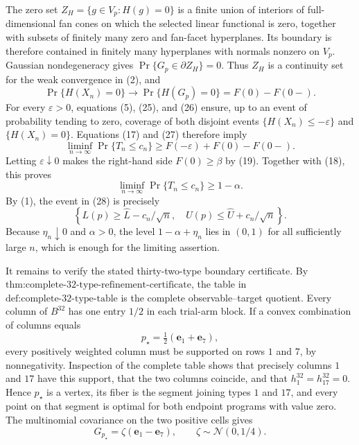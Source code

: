 The zero set \(Z_H=\{g\in V_p:H(g)=0\}\) is a finite union of interiors of full-dimensional fan cones on which the selected linear functional is zero, together with subsets of finitely many zero and fan-facet hyperplanes.  Its boundary is therefore contained in finitely many hyperplanes with normals nonzero on \(V_p\).  Gaussian nondegeneracy gives \(\Pr\{G_p\in\partial Z_H\}=0\).  Thus \(Z_H\) is a continuity set for the weak convergence in (2), and
\[
\Pr\{H(X_n)=0\}\longrightarrow
\Pr\{H(G_p)=0\}=F(0)-F(0-).
\tag{27}
\]
For every \(\varepsilon>0\), equations (5), (25), and (26) ensure, up to an event of probability tending to zero, coverage of both disjoint events \(\{H(X_n)\leq-\varepsilon\}\) and \(\{H(X_n)=0\}\).  Equations (17) and (27) therefore imply
\[
\liminf_{n\to\infty}\Pr\{T_n\leq c_n\}
\geq F(-\varepsilon)+F(0)-F(0-).
\]
Letting \(\varepsilon\downarrow0\) makes the right-hand side \(F(0)\geq\beta\) by (19).  Together with (18), this proves
\[
\liminf_{n\to\infty}\Pr\{T_n\leq c_n\}\geq1-\alpha.
\tag{28}
\]
By (1), the event in (28) is precisely
\[
\left\{L(p)\geq\widehat L-c_n/\sqrt n,\quad
U(p)\leq\widehat U+c_n/\sqrt n\right\}.
\]
Because \(\eta_n\downarrow0\) and \(\alpha>0\), the level \(1-\alpha+\eta_n\) lies in \((0,1)\) for all sufficiently large \(n\), which is enough for the limiting assertion.

It remains to verify the stated thirty-two-type boundary certificate.  By \(\text{thm:complete-32-type-refinement-certificate}\), the table in \(\text{def:complete-32-type-table}\) is the complete observable--target quotient.  Every column of \(B^{32}\) has one entry \(1/2\) in each trial-arm block.  If a convex combination of columns equals
\[
p_\star=\tfrac12(\mathbf e_1+\mathbf e_7),
\]
every positively weighted column must be supported on rows \(1\) and \(7\), by nonnegativity.  Inspection of the complete table shows that precisely columns \(1\) and \(17\) have this support, that the two columns coincide, and that \(h^{32}_1=h^{32}_{17}=0\).  Hence \(p_\star\) is a vertex, its fiber is the segment joining types \(1\) and \(17\), and every point on that segment is optimal for both endpoint programs with value zero.  The multinomial covariance on the two positive cells gives
\[
G_{p_\star}=\zeta(\mathbf e_1-\mathbf e_7),
\qquad \zeta\sim\mathcal N(0,1/4).
\tag{29}
\]

